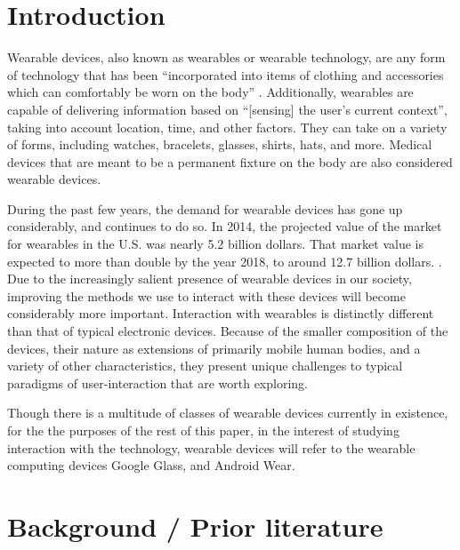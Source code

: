 \documentclass[12pt]{article}
\begin{document}
\section{Introduction}
Wearable devices, also known as wearables or wearable technology, are any form of technology that has been ``incorporated into items of clothing and accessories which can comfortably be worn on the body'' \cite{wd}. Additionally, wearables are capable of delivering information based on ``[sensing] the user's current context'', taking into account location, time, and other factors\cite{star}. They can take on a variety of forms, including watches, bracelets, glasses, shirts, hats, and more. Medical devices that are meant to be a permanent fixture on the body are also considered wearable devices.
%

During the past few years, the demand for wearable devices has gone up considerably, and continues to do so. In 2014, the projected value of the market for wearables in the U.S. was nearly 5.2 billion dollars. That market value is expected to more than double by the year 2018, to around 12.7 billion dollars. \cite{wmv}. Due to the increasingly salient presence of wearable devices in our society, improving the methods we use to interact with these devices will become considerably more important. Interaction with wearables is distinctly different than that of typical electronic devices.  Because of the smaller composition of the devices, their nature as extensions of primarily mobile human bodies, and a variety of other characteristics, they present unique challenges to typical paradigms of user-interaction that are worth exploring.

Though there is a multitude of classes of wearable devices currently in existence, for the the purposes of the rest of this paper, in the interest of studying interaction with the technology, wearable devices will refer to the wearable computing devices Google Glass, and Android Wear.

\section{Background / Prior literature}
\end{document}
